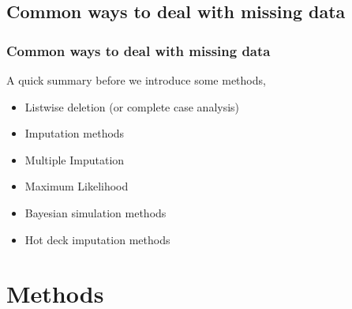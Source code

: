 \documentclass{beamer}
\begin{document}
\subsection{Common ways to deal with missing data}
\fontsize{11pt}{7.2}\selectfont
\begin{frame}
\frametitle{Common ways to deal with missing data}
A quick summary before we introduce some methods, \cite{p3}\\
	\begin{itemize}
		\item Listwise deletion (or complete case analysis)
		\item Imputation methods
		\item Multiple Imputation
		\item Maximum Likelihood 
		\item Bayesian simulation methods
		\item Hot deck imputation methods
	\end{itemize}
\end{frame}

\section{Methods}
\end{document}
